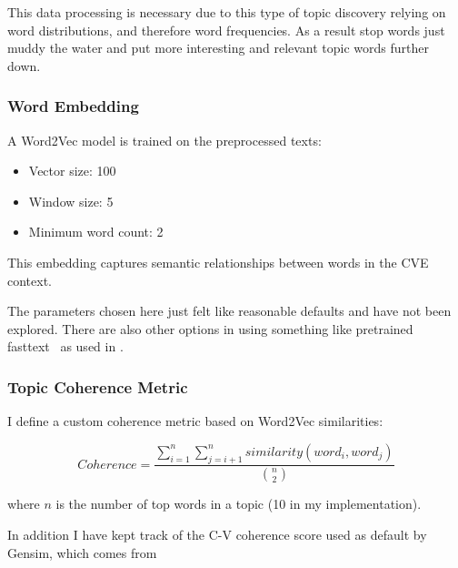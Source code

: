 \documentclass[12pt]{article}
\begin{document}
This data processing is necessary due to this type of topic discovery relying on word distributions,
and therefore word frequencies. As a result stop words just muddy the water and put more interesting
and relevant topic words further down.

\subsubsection*{Word Embedding}

A Word2Vec model is trained on the preprocessed texts:

\begin{itemize} \item Vector size: 100 \item Window size: 5 \item Minimum word count: 2
\end{itemize}

This embedding captures semantic relationships between words in the CVE context.

The parameters chosen here just felt like reasonable defaults and have not been explored. There are
also other options in using something like pretrained fasttext~\cite{fasttext} as used in
\cite{nvd_clustering_fasttext}.

\subsubsection*{Topic Coherence Metric}


I define a custom coherence metric based on Word2Vec similarities:

\begin{equation}
	Coherence = \frac{\sum_{i=1}^{n}\sum_{j=i+1}^{n} similarity(word_i, word_j)}{\binom{n}{2}}
\end{equation}

where $n$ is the number of top words in a topic (10 in my implementation).

In addition I have kept track of the C-V coherence score used as default by Gensim, which comes from
\cite{cv_coherence}

\end{document}
